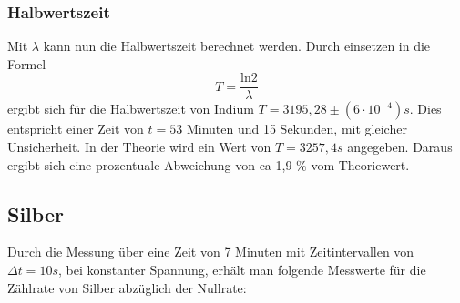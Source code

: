 \subsubsection{Halbwertszeit}
\label{sec:IH}

Mit $\lambda$ kann nun die Halbwertszeit berechnet werden.
Durch einsetzen in die Formel 
\begin{equation}
  T = \frac{\text{ln}2}{\lambda}
  \label{eqn:glTot}
\end{equation}
ergibt sich für die Halbwertszeit von Indium $T = 3195,28 \pm (6 \cdot 10^{-4}) s$.
Dies entspricht einer Zeit von $t = 53$ Minuten und 15 Sekunden, mit gleicher Unsicherheit.
In der Theorie wird ein Wert von $T = 3257,4 s$ \cite{Periode} angegeben.
Daraus ergibt sich eine prozentuale Abweichung von ca 1,9 \% vom Theoriewert.

\subsection{Silber}
\label{sec:silber}

Durch die Messung über eine Zeit von 7 Minuten mit Zeitintervallen von $\Delta t = 10s$, bei konstanter Spannung, erhält man folgende Messwerte für die Zählrate von Silber abzüglich der Nullrate:

